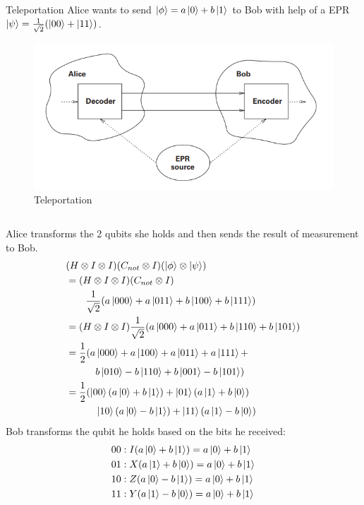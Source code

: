 \documentclass{beamer}
\begin{document}
\begin{frame}{Teleportation}
  {\tiny
  Alice wants to send $\ket{\phi} = a \ket{0} + b\ket{1}$ to Bob with help of a EPR $\ket{\psi} = \frac{1}{\sqrt2} (\ket{00} + \ket{11} )$.
  }%
  \begin{figure}
    \includegraphics[scale=0.15]{figures/teleporation}
    \caption{Teleportation}
  \end{figure}
  \begin{columns}[t]
  {\tiny
  Alice transforms the 2 qubits she holds and then sends the result of measurement to Bob.
  \begin{align*}
    & ( H \otimes I \otimes I ) ( C_{not} \otimes I ) ( \ket{\phi} \otimes \ket{\psi} ) \\
    &= ( H \otimes I \otimes I ) ( C_{not} \otimes I ) \\
    &  \qquad \frac{1}{\sqrt2} ( a \ket{000} + a \ket{011} + b \ket{100} + b \ket{111} ) \\
    &= ( H \otimes I \otimes I ) \frac{1}{\sqrt2} ( a \ket{000} + a \ket{011} + b \ket{110} + b \ket{101} ) \\
    &= \frac{1}{2} ( a \ket{000} + a \ket{100} + a \ket{011} + a \ket{111} + \\
    &  \quad \qquad   b \ket{010} - b \ket{110} + b \ket{001} - b \ket{101}) \\
    &= \frac{1}{2} ( \ket{00} (a\ket0 + b\ket1) + \ket{01} ( a \ket1 + b \ket0) \\
    &  \quad \qquad  \ket{10} (a\ket0 - b\ket1) + \ket{11} ( a \ket1 - b \ket0)
  \end{align*}
  }%
  {\tiny
  Bob transforms the qubit he holds based on the bits he received:
  \begin{align*}
    00&: I (a\ket0 + b\ket1) = a\ket0 + b\ket1 \\
    01&: X (a\ket1 + b\ket0) = a\ket0 + b\ket1 \\
    10&: Z (a\ket0 - b\ket1) = a\ket0 + b\ket1 \\
    11&: Y (a\ket1 - b\ket0) = a\ket0 + b\ket1
  \end{align*}
  }%
  \end{columns}
\end{frame}
\end{document}
